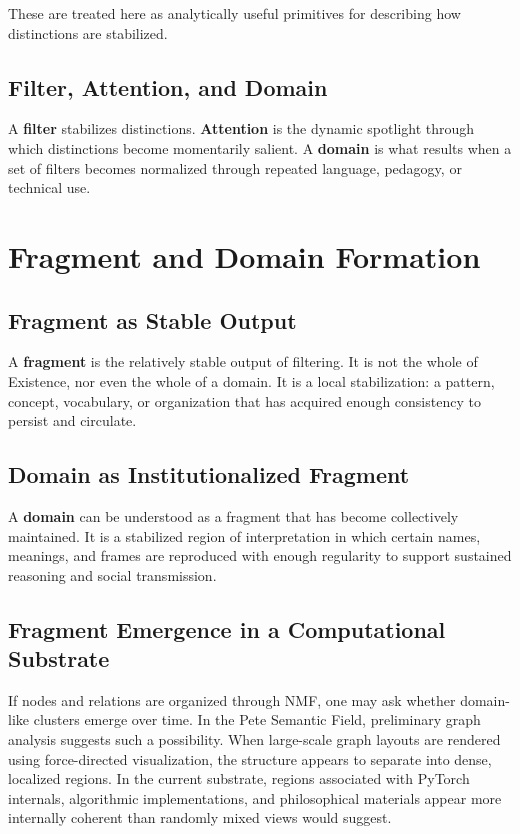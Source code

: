 \documentclass[11pt,a4paper]{article}
\newcommand{\term}[1]{\textbf{#1}}
\begin{document}
These are treated here as analytically useful primitives for describing how distinctions are stabilized.

\subsection{Filter, Attention, and Domain}

A \term{filter} stabilizes distinctions. \term{Attention} is the dynamic spotlight through which distinctions become momentarily salient. A \term{domain} is what results when a set of filters becomes normalized through repeated language, pedagogy, or technical use.

\section{Fragment and Domain Formation}

\subsection{Fragment as Stable Output}

A \term{fragment} is the relatively stable output of filtering. It is not the whole of Existence, nor even the whole of a domain. It is a local stabilization: a pattern, concept, vocabulary, or organization that has acquired enough consistency to persist and circulate.

\subsection{Domain as Institutionalized Fragment}

A \term{domain} can be understood as a fragment that has become collectively maintained. It is a stabilized region of interpretation in which certain names, meanings, and frames are reproduced with enough regularity to support sustained reasoning and social transmission.

\subsection{Fragment Emergence in a Computational Substrate}

If nodes and relations are organized through NMF, one may ask whether domain-like clusters emerge over time. In the Pete Semantic Field, preliminary graph analysis suggests such a possibility. When large-scale graph layouts are rendered using force-directed visualization, the structure appears to separate into dense, localized regions. In the current substrate, regions associated with PyTorch internals, algorithmic implementations, and philosophical materials appear more internally coherent than randomly mixed views would suggest.
\end{document}
